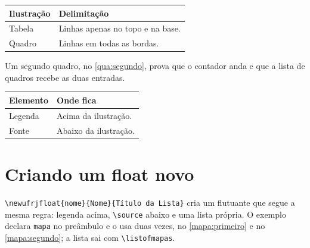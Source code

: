 \documentclass[dsc,setavermelha]{ufrj}
\theoremstyle{plain}
\theoremstyle{definition}
\theoremstyle{remark}
\begin{document}
\begin{framefloat}[ht]
\centering
\caption{Exemplo de Quadro}
\label{qua:exemplo}
\begin{tabular}{|l|l|}
\hline
\textbf{Ilustração} & \textbf{Delimitação} \\
\hline
Tabela & Linhas apenas no topo e na base. \\
\hline
Quadro & Linhas em todas as bordas. \\
\hline
\end{tabular}
\end{framefloat}

Um segundo quadro, no \autoref{qua:segundo}, prova que o contador anda e que a lista de quadros recebe as duas entradas.

\begin{framefloat}[ht]
\centering
\caption{Segundo Quadro, para provar a numeração}
\label{qua:segundo}
\begin{tabular}{|l|l|}
\hline
\textbf{Elemento} & \textbf{Onde fica} \\
\hline
Legenda & Acima da ilustração. \\
\hline
Fonte & Abaixo da ilustração. \\
\hline
\end{tabular}
\end{framefloat}

\section{Criando um float novo}

\verb|\newufrjfloat{nome}{Nome}{Título da Lista}| cria um flutuante que segue a mesma regra: legenda acima, \verb|\source| abaixo e uma lista própria. O exemplo declara \verb|mapa| no preâmbulo e o usa duas vezes, no \autoref{mapa:primeiro} e no \autoref{mapa:segundo}; a lista sai com \verb|\listofmapas|.

\begin{mapa}[ht]
\centering
\caption{Primeiro mapa, num float criado pelo autor}
\label{mapa:primeiro}
\end{mapa}
\end{document}

